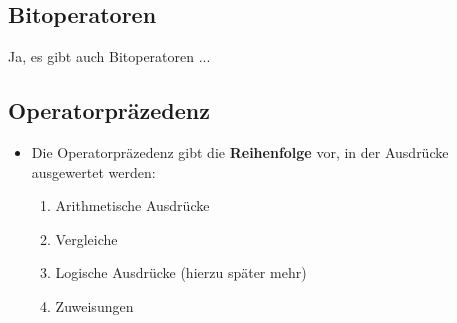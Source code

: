 \subsection{Bitoperatoren}
\begin{frame}
    \slidehead
    Ja, es gibt auch Bitoperatoren ...
\end{frame}

\livecoding

\subsection{Operatorpräzedenz}
\begin{frame}
    \slidehead

    \pause
    \pause
    \begin{itemize}
        \item Die Operatorpräzedenz gibt die \textbf{Reihenfolge} vor, in der Ausdrücke ausgewertet werden:
            \begin{enumerate}
                \item Arithmetische Ausdrücke
                \item Vergleiche
                \item Logische Ausdrücke (hierzu später mehr)
                \item Zuweisungen
            \end{enumerate}
    \end{itemize}
\end{frame}

%


%

